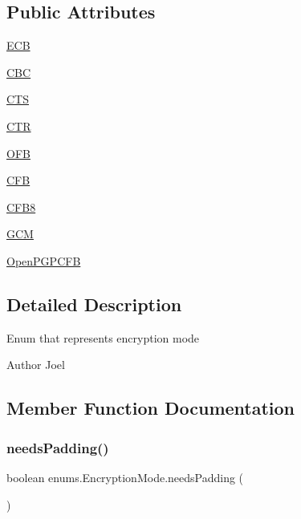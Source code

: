 \subsection*{Public Attributes}
\begin{DoxyCompactItemize}
\item 
\mbox{\hyperlink{enumenums_1_1_encryption_mode_a831e6f9b4ebee142fd37a2d9143e7ead}{E\+CB}}
\item 
\mbox{\hyperlink{enumenums_1_1_encryption_mode_aa29cbb4b7dd9df3d006a314ea59ed26a}{C\+BC}}
\item 
\mbox{\hyperlink{enumenums_1_1_encryption_mode_ad9dda0b4cc55fbebbe6f9a01c5a021bf}{C\+TS}}
\item 
\mbox{\hyperlink{enumenums_1_1_encryption_mode_a829ee0e97cc9ae5b993831e6480121b5}{C\+TR}}
\item 
\mbox{\hyperlink{enumenums_1_1_encryption_mode_ab70b932ac1180540349b92f1d7e35583}{O\+FB}}
\item 
\mbox{\hyperlink{enumenums_1_1_encryption_mode_a99db2d5f232ffc0816b56a0063188a08}{C\+FB}}
\item 
\mbox{\hyperlink{enumenums_1_1_encryption_mode_a358627f8083d8ff87ab6108875405b86}{C\+F\+B8}}
\item 
\mbox{\hyperlink{enumenums_1_1_encryption_mode_addd3094c9166d5613431103375aaa283}{G\+CM}}
\item 
\mbox{\hyperlink{enumenums_1_1_encryption_mode_a6b9eea2a9bec10b9fe64aa88322f2534}{Open\+P\+G\+P\+C\+FB}}
\end{DoxyCompactItemize}


\subsection{Detailed Description}
Enum that represents encryption mode \begin{DoxyAuthor}{Author}
Joel 
\end{DoxyAuthor}


\subsection{Member Function Documentation}
\mbox{\label{enumenums_1_1_encryption_mode_abc3ed93ffd8203abd9318e8c6ea057ba}} 
\subsubsection{\texorpdfstring{needs\+Padding()}{needsPadding()}}
{\footnotesize\ttfamily boolean enums.\+Encryption\+Mode.\+needs\+Padding (\begin{DoxyParamCaption}{ }\end{DoxyParamCaption})}

